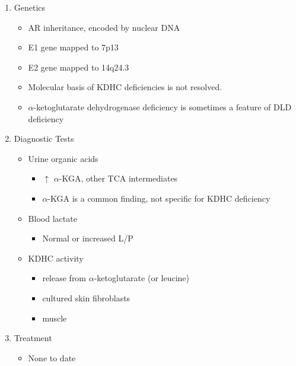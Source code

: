 \documentclass{scrartcl}
\begin{document}
\begin{enumerate}
\item Genetics
\label{sec:orgb1b6b5f}
\begin{itemize}
\item AR inheritance, encoded by nuclear DNA
\item E1 gene mapped to 7p13
\item E2 gene mapped to 14q24.3
\item Molecular basis of KDHC deficiencies is not resolved.
\item \(\alpha\)-ketoglutarate dehydrogenase deficiency is sometimes a feature of DLD deficiency
\end{itemize}

\item Diagnostic Tests
\label{sec:org842860d}
\begin{itemize}
\item Urine organic acids
\begin{itemize}
\item \(\uparrow\) \(\alpha\)-KGA, \textpm{} other TCA intermediates
\item \(\alpha\)-KGA is a common finding, not specific for KDHC deficiency
\end{itemize}
\item Blood lactate
\begin{itemize}
\item Normal or increased L/P
\end{itemize}
\item KDHC activity
\begin{itemize}
\item {} release from \ce{[1-^14C]} \(\alpha\)-ketoglutarate (or \ce{[1-^14C]} leucine)
\item cultured skin fibroblasts
\item muscle
\end{itemize}
\end{itemize}

\item Treatment
\label{sec:orgc826d53}
\begin{itemize}
\item None to date
\end{itemize}
\end{enumerate}
\end{document}
